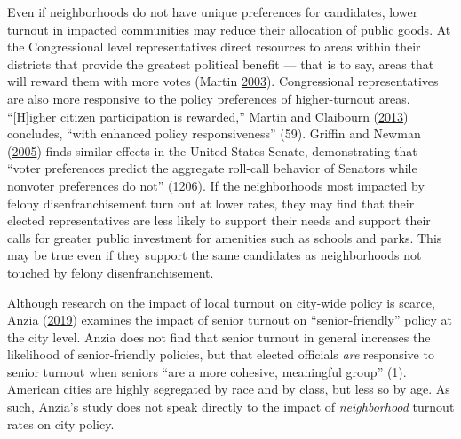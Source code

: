 \documentclass[
  12pt,
]{article}
\begin{document}
Even if neighborhoods do not have unique preferences for candidates, lower turnout in impacted communities may reduce their allocation of public goods. At the Congressional level representatives direct resources to areas within their districts that provide the greatest political benefit --- that is to say, areas that will reward them with more votes (Martin \protect\hyperlink{ref-Martin2003}{2003}). Congressional representatives are also more responsive to the policy preferences of higher-turnout areas. ``{[}H{]}igher citizen participation is rewarded,'' Martin and Claibourn (\protect\hyperlink{ref-Martin2013}{2013}) concludes, ``with enhanced policy responsiveness'' (59). Griffin and Newman (\protect\hyperlink{ref-Griffin2005}{2005}) finds similar effects in the United States Senate, demonstrating that ``voter preferences predict the aggregate roll-call behavior of Senators while nonvoter preferences do not'' (1206). If the neighborhoods most impacted by felony disenfranchisement turn out at lower rates, they may find that their elected representatives are less likely to support their needs and support their calls for greater public investment for amenities such as schools and parks. This may be true even if they support the same candidates as neighborhoods not touched by felony disenfranchisement.

Although research on the impact of local turnout on city-wide policy is scarce, Anzia (\protect\hyperlink{ref-Anzia2019}{2019}) examines the impact of senior turnout on ``senior-friendly'' policy at the city level. Anzia does not find that senior turnout in general increases the likelihood of senior-friendly policies, but that elected officials \emph{are} responsive to senior turnout when seniors ``are a more cohesive, meaningful group'' (1). American cities are highly segregated by race and by class, but less so by age. As such, Anzia's study does not speak directly to the impact of \emph{neighborhood} turnout rates on city policy.
\end{document}
